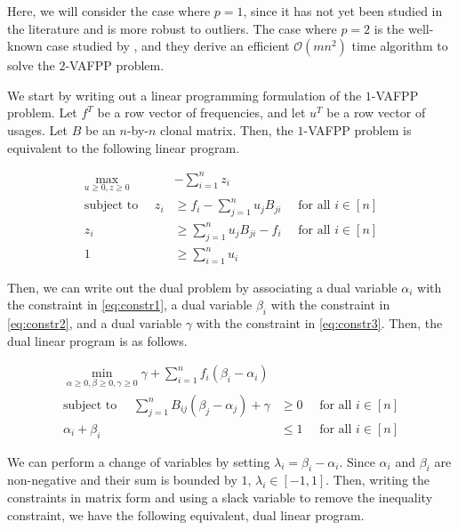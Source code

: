 \documentclass[11pt]{article}
\begin{document}
Here, we will consider the case where $p = 1$, since it has not yet been 
studied in the literature and is more robust to outliers. 
The case where $p = 2$ is the well-known case studied by \cite{jia_efficient_2018},
and they derive an efficient $\mathcal{O}(mn^2)$ time algorithm to solve the
$2$-VAFPP problem.

We start by writing out a linear programming formulation of the $1$-VAFPP problem.
Let $f^T$ be a row vector of frequencies, and let $u^T$ be a row vector of usages.
Let $B$ be an $n$-by-$n$ clonal matrix. Then, the $1$-VAFPP problem is equivalent
to the following linear program.

\begin{mdframed}
\begin{align}
  \max_{u \geq 0, z \geq 0} &-\sum_{i=1}^n z_i \nonumber \\
  \text{subject to }\quad z_i &\geq f_i - \sum_{j=1}^n u_j B_{ji} \quad\text{ for all } i \in [n] \label{eq:constr1} \\
  z_i &\geq \sum_{j=1}^n u_j B_{ji} - f_i \quad\text{ for all } i \in [n] \label{eq:constr2} \\
  1 &\geq \sum_{i=1}^n u_i \label{eq:constr3}
\end{align}
\end{mdframed}

Then, we can write out the dual problem by associating
a dual variable $\alpha_i$ with the constraint in \eqref{eq:constr1},
a dual variable $\beta_i$ with the constraint in \eqref{eq:constr2},
and a dual variable $\gamma$ with the constraint in \eqref{eq:constr3}.
Then, the dual linear program is as follows.

\begin{mdframed}
  \begin{align}
    \min_{\alpha \geq 0, \beta \geq 0, \gamma \geq 0} \gamma + \sum_{i=1}^n f_i(\beta_i - \alpha_i) \nonumber \\
    \text{subject to } \quad 
    \sum_{j=1}^n B_{ij}(\beta_j - \alpha_j) + \gamma &\geq 0 \quad\text{ for all } i \in [n] \label{eq:dualconstr0} \\
    \alpha_i + \beta_i &\leq 1 \quad\text{ for all } i \in [n] \label{eq:dualconstr1}
  \end{align}
\end{mdframed}

We can perform a change of variables by setting $\lambda_i = \beta_i - \alpha_i$.
Since $\alpha_i$ and $\beta_i$ are non-negative and their sum is bounded by $1$, 
$\lambda_i \in [-1, 1]$. Then, writing the constraints in matrix form and 
using a slack variable to remove the inequality constraint, we have
the following equivalent, dual linear program.
\end{document}
